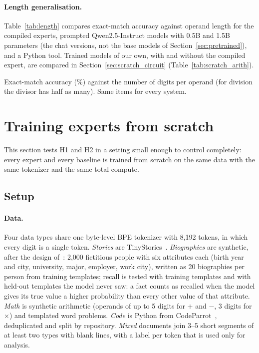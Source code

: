 \documentclass[10pt]{article}
\newcommand{\pending}[1]{{\color{red}\textbf{[#1]}}}
\begin{document}
\paragraph{Length generalisation.} Table~\ref{tab:length} compares exact-match accuracy against
operand length for the compiled experts, prompted Qwen2.5-Instruct models with 0.5B and 1.5B
parameters (the chat versions, not the base models of Section~\ref{sec:pretrained}), and a
Python tool. Trained models of our own, with and without the compiled expert,
are compared in Section~\ref{sec:scratch_circuit} (Table~\ref{tab:scratch_arith}).
\begin{table}[t]
\centering\small
\caption{Exact-match accuracy (\%) against the number of digits per operand (for division the
divisor has half as many). Same items for every system.}
\label{tab:length}
\IfFileExists{tables/track_a_length_generalisation.tex}{}{\pending{table}}
\end{table}

\section{Training experts from scratch}
\label{sec:scratch}

This section tests H1 and H2 in a setting small enough to control completely: every expert and
every baseline is trained from scratch on the same data with the same tokenizer and the same
total compute.

\subsection{Setup}
\label{sec:scratch_setup}

\paragraph{Data.} Four data types share one byte-level BPE tokenizer with 8{,}192 tokens, in
which every digit is a single token. \emph{Stories} are TinyStories~\citep{eldan2023tinystories}.
\emph{Biographies} are synthetic, after the design of~\citet{allenzhu2024physics}: 2{,}000 fictitious people with six attributes each (birth
year and city, university, major, employer, work city), written as 20 biographies per person
from training templates; recall is tested with training templates and with held-out templates
the model never saw: a fact counts as recalled when the model gives its true value a higher
probability than every other value of that attribute. \emph{Math} is synthetic arithmetic (operands of up to 5 digits for $+$ and $-$,
3 digits for $\times$) and templated word problems. \emph{Code} is Python from
CodeParrot~\citep{codeparrot}, deduplicated and split by repository. \emph{Mixed} documents
join 3--5 short segments of at least two types with blank lines, with a label per token that is
used only for analysis.
\end{document}
